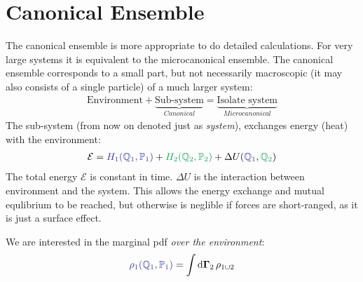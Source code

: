 \documentclass[../template.tex]{subfiles}
\begin{document}
\section{Canonical Ensemble}
The canonical ensemble is more appropriate to do detailed calculations. For very large systems it is equivalent to the microcanonical ensemble. The canonical ensemble corresponds to a small part, but not necessarily macroscopic (it may also consists of a single particle) of a much larger system:
\begin{align*}
    \text{Environment} + \underbrace{\text{Sub-system}}_{\textit{Canonical}}  = \underbrace{\text{Isolate system}}_{\textit{Microcanonical} } 
\end{align*}
The sub-system (from now on denoted just as \textit{system}), exchanges energy (heat) with the environment:
\begin{align*}
    \mathcal{E} = \textcolor{Blue}{H_1(\mathbb{Q}_1, \mathbb{P}_1)} + \textcolor{ForestGreen}{H_2(\mathbb{Q}_2, \mathbb{P}_2)} + \Delta U(\textcolor{Blue}{\mathbb{Q}_1}, \textcolor{ForestGreen}{\mathbb{Q}_2})
\end{align*}
The total energy $\mathcal{E}$ is constant in time. $\Delta U$ is the interaction between environment and the system. This allows the energy exchange and mutual equlibrium to be reached, but otherwise is neglible if forces are short-ranged, as it is just a surface effect. 

\medskip

We are interested in the marginal pdf \textit{over the environment}:
\begin{align*}
    \textcolor{Blue}{\rho_1(\mathbb{Q}_1,\mathbb{P}_1)} = \int \dd{\bm{\Gamma}_2} \rho_{1 \cup 2}
\end{align*}

\end{document}
